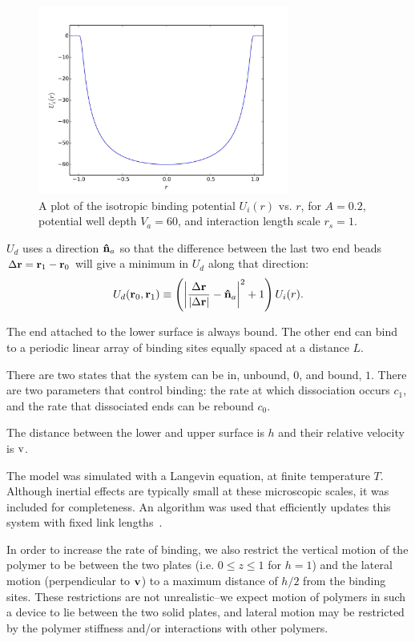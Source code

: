 \documentclass[journal = mamobx, manuscript = article]{achemso}
\def\br{{\bf r}}
\def\delr{{\Delta \br}}
\def\nhat{{\bf\hat n}}
\begin{document}
\begin{figure}[htp]
\begin{center}
\includegraphics[width=3.25in]{expVplot}
\caption{
A plot of the isotropic binding potential $U_i(r)$ vs. $r$, for $A=0.2$, potential well depth $V_a = 60$, and interaction length scale $r_s = 1$. 
}
\label{fig:expVplot}
\end{center}
\end{figure}

$U_d$ uses a direction $\nhat_a$ so that the difference
between the last two end beads $\delr = \br_1- \br_0$ will give a minimum in $U_d$
along that direction:
\begin{equation}
U_d(\br_0, \br_1) \equiv \left( \left| \frac{\delr}{|\delr|}-\nhat_a \right|^2 + 1 \right) U_i(r) .
\end{equation}

The end attached to the lower surface is always bound. The other end can bind to
a periodic linear array of binding sites equally spaced at a distance $L$.

There are two states that the system can be in, unbound, $0$, and bound, $1$. 
There are two parameters that control binding: the rate at which dissociation
occurs $c_1$, and the rate that dissociated ends can be rebound $c_0$.

The distance between the lower and upper surface is $h$ and their relative
velocity is $\rm v$.

The model was simulated with a Langevin equation, at finite temperature $T$.
Although inertial effects are typically small at these microscopic scales, it
was included for completeness. An algorithm was used that efficiently updates
this system with fixed link lengths~\cite{DeutschCerfFriction}.

In order to increase the rate of binding, we also restrict the vertical motion of the polymer to be between the two plates (i.e. $0\leq z\leq 1$ for $h=1$) and the lateral motion (perpendicular to $\bf{v}$) to a maximum distance of $h/2$ from the binding sites. These restrictions are not unrealistic--we expect motion of polymers in such a device to lie between the two solid plates, and lateral motion may be restricted by the polymer stiffness and/or interactions with other polymers.
\end{document}
